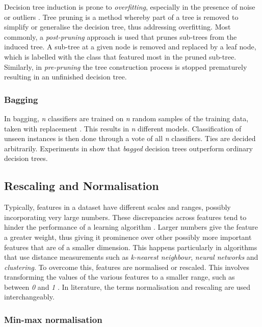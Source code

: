 \documentclass{article}[paper=a4,pagesize=auto,10pt]
\begin{document}
Decision tree induction is prone to \textit{overfitting}, especially in the presence of noise or outliers \cite{han2011data}. Tree pruning is a method whereby part of a tree is removed to simplify or generalise the decision tree, thus addressing overfitting. Most commonly, a \textit{post-pruning} approach is used that prunes sub-trees from the induced tree. A sub-tree at a given node is removed and replaced by a leaf node, which is labelled with the class that featured most in the pruned sub-tree. Similarly, in \textit{pre-pruning} the tree construction process is stopped prematurely resulting in an unfinished decision tree.

\subsubsection{Bagging} \label{Bagging}

In bagging, \textit{n} classifiers are trained on \textit{n} random samples of the training data, taken with replacement \cite{quinlan1996bagging}. This results in \textit{n} different models. Classification of unseen instances is then done through a vote of all \textit{n} classifiers. Ties are decided arbitrarily. Experiments in \cite{quinlan1996bagging} show that \textit{bagged} decision trees outperform ordinary decision trees.

\subsection{Rescaling and Normalisation} \label{Rescaling and Normalisation}

Typically, features in a dataset have different scales and ranges, possibly incorporating very large numbers.  These discrepancies across features tend to hinder the performance of a learning algorithm \cite{han2011data}. Larger numbers give the feature a greater weight, thus giving it prominence over other possibly more important features that are of a smaller dimension.  This happens particularly in algorithms that use distance measurements such as \textit{k-nearest neighbour}, \textit{neural networks} and \textit{clustering}.  To overcome this, features are normalised or rescaled.  This involves transforming the values of the various features to a smaller range, such as between \textit{0} and \textit{1} \cite{han2011data,mohamad2013standardization,garcia2015data}. In literature, the terms normalisation and rescaling are used interchangeably.

\subsubsection{Min-max normalisation} \label{Min-max normalisation}
\end{document}
